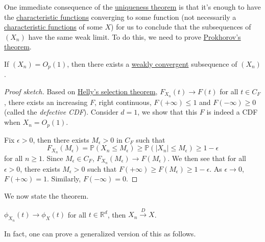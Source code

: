 One immediate consequence of the \hyperref[thm:uniqueness]{uniqueness theorem} is that it's enough to have the \hyperref[def:characteristic-function]{characteristic functions} converging to some function (not necessarily a \hyperref[def:characteristic-function]{characteristic functions} of some \(X\)) for us to conclude that the subsequences of \((X_n)\) have the same weak limit. To do this, we need to prove \hyperref[thm:Prokhorov]{Prokhorov's theorem}.

\begin{theorem}\label{thm:Prokhorov}
	If \((X_n) = O_p(1)\), then there exists a \hyperref[def:converge-weakly]{weakly convergent} subsequence of \((X_n)\).
\end{theorem}
\begin{proof}[Proof sketch]
	Based on \href{https://en.wikipedia.org/wiki/Helly%27s_selection_theorem}{Helly's selection theorem}, \(F_{X_n}(t) \to F(t)\) for all \(t \in C_F\), there exists an increasing \(F\), right continuous, \(F(+\infty ) \leq 1\) and \(F(-\infty ) \geq 0\) (called the \emph{defective CDF}). Consider \(d = 1\), we show that this \(F\) is indeed a CDF when \(X_n = O_p(1)\).

	Fix \(\epsilon > 0\), then there exists \(M_{\epsilon } > 0\) in \(C_F\) such that
	\[
		F_{X_n}(M_{\epsilon } )
		=\mathbb{P} (X_n \leq M_{\epsilon } )
		\geq \mathbb{P} (\vert X_n \vert \leq M_{\epsilon } )
		\geq 1 - \epsilon
	\]
	for all \(n \geq 1\). Since \(M_{\epsilon } \in C_F\), \(F_{X_n}(M_{\epsilon } ) \to F(M_{\epsilon } )\). We then see that for all \(\epsilon > 0\), there exists \(M_{\epsilon } > 0 \) such that \(F(+\infty ) \geq F(M_{\epsilon } ) \geq 1 - \epsilon \). As \(\epsilon \to 0\), \(F(+\infty ) = 1\). Similarly, \(F(-\infty ) = 0\).
\end{proof}

We now state the theorem.

\begin{theorem}
	\(\phi _{X_n}(t) \to \phi _X(t)\) for all \(t \in \mathbb{R} ^d\), then \(X_n \overset{D}{\to } X\).
\end{theorem}

In fact, one can prove a generalized version of this as follows.

